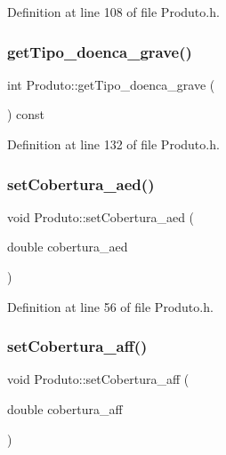 Definition at line 108 of file Produto.\+h.

\hypertarget{class_produto_a8dc442d4a281ea7c5b3908c6bcfc0569}{}\label{class_produto_a8dc442d4a281ea7c5b3908c6bcfc0569} 
\subsubsection{\texorpdfstring{get\+Tipo\+\_\+doenca\+\_\+grave()}{getTipo\_doenca\_grave()}}
{\footnotesize\ttfamily int Produto\+::get\+Tipo\+\_\+doenca\+\_\+grave (\begin{DoxyParamCaption}{ }\end{DoxyParamCaption}) const\hspace{0.3cm}{\ttfamily [inline]}}



Definition at line 132 of file Produto.\+h.

\hypertarget{class_produto_afa6e7624fccfaa7437f193278dacab59}{}\label{class_produto_afa6e7624fccfaa7437f193278dacab59} 
\subsubsection{\texorpdfstring{set\+Cobertura\+\_\+aed()}{setCobertura\_aed()}}
{\footnotesize\ttfamily void Produto\+::set\+Cobertura\+\_\+aed (\begin{DoxyParamCaption}\item[{double}]{cobertura\+\_\+aed }\end{DoxyParamCaption})\hspace{0.3cm}{\ttfamily [inline]}}



Definition at line 56 of file Produto.\+h.

\hypertarget{class_produto_a544f9837a80bee41a47610ce03071757}{}\label{class_produto_a544f9837a80bee41a47610ce03071757} 
\subsubsection{\texorpdfstring{set\+Cobertura\+\_\+aff()}{setCobertura\_aff()}}
{\footnotesize\ttfamily void Produto\+::set\+Cobertura\+\_\+aff (\begin{DoxyParamCaption}\item[{double}]{cobertura\+\_\+aff }\end{DoxyParamCaption})\hspace{0.3cm}{\ttfamily [inline]}}



